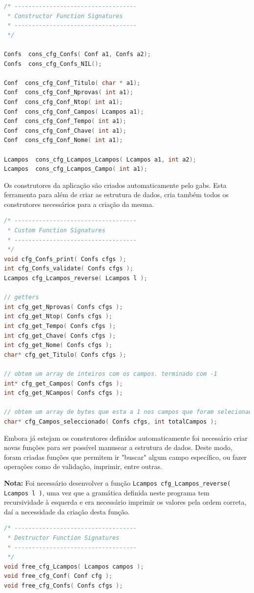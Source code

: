 \documentclass[11pt, a4paper, oneside]{article}
\begin{document}
\begin{lstlisting}[language=C, caption={Construtores do ficheiro de configuração.}]
/* -----------------------------------
 * Constructor Function Signatures
 * -----------------------------------
 */

Confs  cons_cfg_Confs( Conf a1, Confs a2);
Confs  cons_cfg_Confs_NIL();

Conf  cons_cfg_Conf_Titulo( char * a1);
Conf  cons_cfg_Conf_Nprovas( int a1);
Conf  cons_cfg_Conf_Ntop( int a1);
Conf  cons_cfg_Conf_Campos( Lcampos a1);
Conf  cons_cfg_Conf_Tempo( int a1);
Conf  cons_cfg_Conf_Chave( int a1);
Conf  cons_cfg_Conf_Nome( int a1);

Lcampos  cons_cfg_Lcampos_Lcampos( Lcampos a1, int a2);
Lcampos  cons_cfg_Lcampos_Campo( int a1);
\end{lstlisting} 

Os construtores da aplicação são criados automaticamente pelo \textsf{gabs}. Esta ferramenta para além de criar as estrutura de dados, cria também todos os construtores necessários para a criação da mesma.

\begin{lstlisting}[language=C, caption={Funções do ficheiro de configuração.}]
/* -----------------------------------
 * Custom Function Signatures
 * -----------------------------------
 */
void cfg_Confs_print( Confs cfgs );
int cfg_Confs_validate( Confs cfgs );
Lcampos cfg_Lcampos_reverse( Lcampos l );

// getters
int cfg_get_Nprovas( Confs cfgs );
int cfg_get_Ntop( Confs cfgs );
int cfg_get_Tempo( Confs cfgs );
int cfg_get_Chave( Confs cfgs );
int cfg_get_Nome( Confs cfgs );
char* cfg_get_Titulo( Confs cfgs );

// obtem um array de inteiros com os campos. terminado com -1
int* cfg_get_Campos( Confs cfgs );
int cfg_get_NCampos( Confs cfgs );

// obtem um array de bytes que esta a 1 nos campos que foram selecionados
char* cfg_Campos_seleccionado( Confs cfgs, int totalCampos );
\end{lstlisting} 

Embora já estejam os construtores definidos automaticamente foi necessário criar novas funções para ser possível manusear a estrutura de dados. Deste modo, foram criadas funções que permitem ir "buscar" algum campo específico, ou fazer operações como de validação, imprimir, entre outras.

\textbf{Nota:} Foi necessário desenvolver a função \texttt{Lcampos cfg\_Lcampos\_reverse( Lcampos l )}, uma vez que a gramática definida neste programa tem recursividade à esquerda e era necessário imprimir os valores pela ordem correta, daí a necessidade da criação desta função.
\newpage
\begin{lstlisting}[language=C, caption={Funções de libertação de memória.}]
/* -----------------------------------
 * Destructor Function Signatures
 * -----------------------------------
 */
void free_cfg_Lcampos( Lcampos campos );
void free_cfg_Conf( Conf cfg );
void free_cfg_Confs( Confs cfgs );
\end{lstlisting} 
\end{document}
